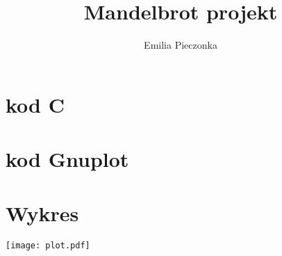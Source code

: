 \documentclass{article}
\begin{document}
 \title{Mandelbrot projekt}
 \author{Emilia Pieczonka}
 \maketitle
 
 \tableofcontents
 \newpage
 
 \section{kod C}
 
 
 \section{kod Gnuplot}
 
 
 \section{Wykres}
 \texttt{[image: plot.pdf]}
\end{document}
